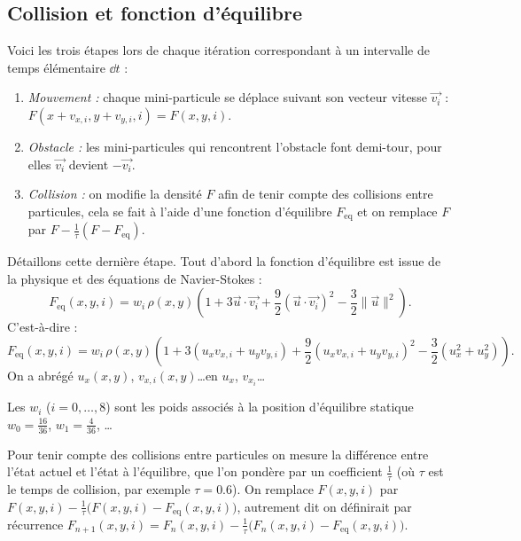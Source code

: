 \documentclass[11pt,class=report,crop=false]{standalone}
\begin{document}
\subsection{Collision et fonction d'équilibre}

Voici les trois étapes lors de chaque itération correspondant à un intervalle de temps élémentaire $\dd t$ :
\begin{enumerate}
	\item \emph{Mouvement :} chaque mini-particule se déplace suivant son vecteur vitesse $\vec{v_i}$ : $F(x + v_{x,i}, y + v_{y,i}, i) = F(x, y, i)$.
	
	\item \emph{Obstacle :} les mini-particules qui rencontrent l'obstacle font demi-tour, pour elles $\vec{v_i}$ devient $-\vec{v_i}$.
	
	\item \emph{Collision :}
	on modifie la densité $F$ afin de tenir compte des collisions entre particules, cela se fait à l'aide d'une fonction d'équilibre $F_{\text{eq}}$ et on remplace $F$ par $F - \frac{1}{\tau} (F-F_{\text{eq}})$.
\end{enumerate}

Détaillons cette dernière étape.
Tout d'abord la fonction d'équilibre est issue de la physique et des équations de Navier-Stokes :
$$F_{\text{eq}} (x,y,i) = w_i \, \rho(x,y) \left(1 + 3 \vec{u} \cdot \vec{v_i}  +  \frac92(\vec{u} \cdot \vec{v_i})^2 - \frac32 \| \vec u \| ^2 \right).$$
C'est-à-dire :
$$F_{\text{eq}} (x,y,i) = w_i \, \rho(x,y) \left(1 + 3( u_x v_{x,i} + u_y v_{y,i}) + \frac92(u_x v_{x,i} + u_y v_{y,i})^2 - \frac32 (u_x^2 + u_y^2) \right).$$
On a abrégé $u_x(x,y)$, $v_{x,i}(x,y)$\ldots en $u_x$, $v_{x_i}$\ldots

Les $w_i$ ($i=0,\ldots,8$) sont les poids associés à la position d'équilibre statique $w_0 = \frac{16}{36}$, $w_1 = \frac{4}{36}$, \ldots 


Pour tenir compte des collisions entre particules on mesure la différence entre l'état actuel et l'état à l'équilibre, que l'on pondère par un coefficient $\frac{1}{\tau}$ (où $\tau$ est le temps de collision, par exemple $\tau=0.6$). 
On remplace $F(x,y,i)$ par $F(x,y,i) - \frac1\tau \big(F(x,y,i)-F_{\text{eq}}(x,y,i)\big)$,
autrement dit on définirait par récurrence $F_{n+1}(x,y,i) = F_n(x,y,i) - \frac1\tau \big(F_n(x,y,i)-F_{\text{eq}}(x,y,i)\big)$.
	
\end{document}
